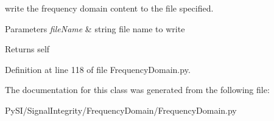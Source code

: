 write the frequency domain content to the file specified. 


\begin{DoxyParams}{Parameters}
{\em file\+Name} & string file name to write \\
\hline
\end{DoxyParams}
\begin{DoxyReturn}{Returns}
self 
\end{DoxyReturn}


Definition at line 118 of file Frequency\+Domain.\+py.



The documentation for this class was generated from the following file\+:\begin{DoxyCompactItemize}
\item 
Py\+S\+I/\+Signal\+Integrity/\+Frequency\+Domain/Frequency\+Domain.\+py\end{DoxyCompactItemize}
